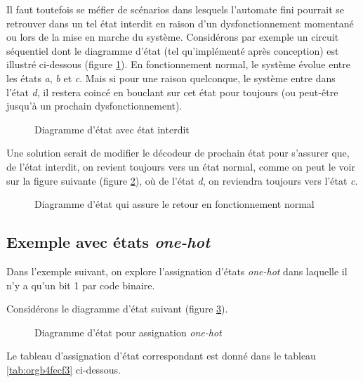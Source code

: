 \documentclass[11pt]{article}
\begin{document}
Il faut toutefois se méfier de scénarios dans lesquels l'automate fini
pourrait se retrouver dans un tel état interdit en raison d'un
dysfonctionnement momentané ou lors de la mise en marche du
système. Considérons par exemple un circuit séquentiel dont le
diagramme d'état (tel qu'implémenté après conception) est illustré
ci-dessous (figure \ref{fig:org8364d9d}). En fonctionnement normal, le
système évolue entre les états \emph{a}, \emph{b} et \emph{c}. Mais si pour une
raison quelconque, le système entre dans l'état \emph{d}, il restera coincé
en bouclant sur cet état pour toujours (ou peut-être jusqu'à un
prochain dysfonctionnement).

\begin{figure}[htbp]
\centering

\caption{\label{fig:org8364d9d}Diagramme d'état avec état interdit}
\end{figure}


Une solution serait de modifier le décodeur de prochain état pour
s'assurer que, de l'état interdit, on revient toujours vers un état
normal, comme on peut le voir sur la figure suivante (figure
\ref{fig:org2c8462b}), où de l'état \emph{d}, on reviendra toujours
vers l'état \emph{c}. 

\begin{figure}[htbp]
\centering

\caption{\label{fig:org2c8462b}Diagramme d'état qui assure le retour en fonctionnement normal}
\end{figure}

\subsection{Exemple avec états \emph{one-hot}}
\label{sec:org7cd8730}

Dans l'exemple suivant, on explore l'assignation d'états \emph{one-hot}
dans laquelle il n'y a qu'un bit 1 par code binaire.

Considérons le diagramme d'état suivant (figure \ref{fig:orgd94dfa3}).

\begin{figure}[htbp]
\centering

\caption{\label{fig:orgd94dfa3}Diagramme d'état pour assignation \emph{one-hot}}
\end{figure}

Le tableau d'assignation d'état correspondant est donné dans le
tableau \ref{tab:orgb4fecf3} ci-dessous.
\end{document}
